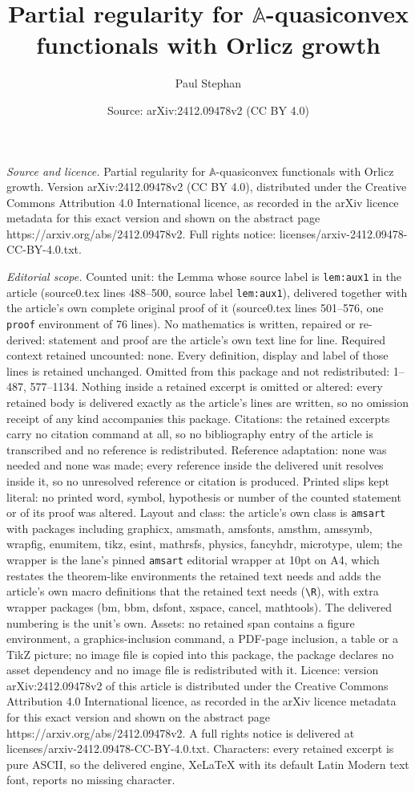 \documentclass[10pt,a4paper]{amsart}
\title[Partial regularity for $\mathbb{A}$-quasiconvex functionals ]{Partial regularity for $\mathbb{A}$-quasiconvex functionals with Orlicz growth}
\author{Paul Stephan}
\date{Source: arXiv:2412.09478v2 (CC BY 4.0)}
\begin{document}
\maketitle

\noindent\emph{Source and licence.} Partial regularity for $\mathbb{A}$-quasiconvex functionals with Orlicz growth. Version arXiv:2412.09478v2 (CC BY 4.0), distributed under the Creative Commons Attribution 4.0 International licence, as recorded in the arXiv licence metadata for this exact version and shown on the abstract page https://arxiv.org/abs/2412.09478v2. Full rights notice: licenses/arxiv-2412.09478-CC-BY-4.0.txt.\par\smallskip

\noindent\textit{Editorial scope.} Counted unit: the Lemma whose source label is \texttt{lem:aux1} in the article (source0.tex lines 488--500, source label \texttt{lem:aux1}), delivered together with the article's own complete original proof of it (source0.tex lines 501--576, one \texttt{proof} environment of 76 lines). No mathematics is written, repaired or re-derived: statement and proof are the article's own text line for line. Required context retained uncounted: none. Every definition, display and label of those lines is retained unchanged. Omitted from this package and not redistributed: 1--487, 577--1134. Nothing inside a retained excerpt is omitted or altered: every retained body is delivered exactly as the article's lines are written, so no omission receipt of any kind accompanies this package. Citations: the retained excerpts carry no citation command at all, so no bibliography entry of the article is transcribed and no reference is redistributed. Reference adaptation: none was needed and none was made; every reference inside the delivered unit resolves inside it, so no unresolved reference or citation is produced. Printed slips kept literal: no printed word, symbol, hypothesis or number of the counted statement or of its proof was altered. Layout and class: the article's own class is \texttt{amsart} with packages including graphicx, amsmath, amsfonts, amsthm, amssymb, wrapfig, enumitem, tikz, esint, mathrsfs, physics, fancyhdr, microtype, ulem; the wrapper is the lane's pinned \texttt{amsart} editorial wrapper at 10pt on A4, which restates the theorem-like environments the retained text needs and adds the article's own macro definitions that the retained text needs (\texttt{\textbackslash R}), with extra wrapper packages (bm, bbm, dsfont, xspace, cancel, mathtools). The delivered numbering is the unit's own. Assets: no retained span contains a figure environment, a graphics-inclusion command, a PDF-page inclusion, a table or a TikZ picture; no image file is copied into this package, the package declares no asset dependency and no image file is redistributed with it. Licence: version arXiv:2412.09478v2 of this article is distributed under the Creative Commons Attribution 4.0 International licence, as recorded in the arXiv licence metadata for this exact version and shown on the abstract page https://arxiv.org/abs/2412.09478v2. A full rights notice is delivered at licenses/arxiv-2412.09478-CC-BY-4.0.txt. Characters: every retained excerpt is pure ASCII, so the delivered engine, XeLaTeX with its default Latin Modern text font, reports no missing character.
\end{document}
